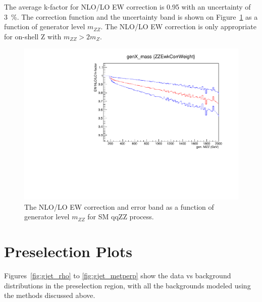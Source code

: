 \vspace{0.3cm}
The average k-factor for NLO/LO EW correction is 0.95 with an uncertainty of 3~\%. 
The correction function and the uncertainty band is shown on Figure~\ref{fig:qqzz_nlo_ew}
as a function of generator level $m_{ZZ}$. 
The NLO/LO EW correction is only appropriate for on-shell Z with $m_{ZZ}>2 m_{Z}$. 

\begin{figure}[htbp!]
\centering
  \includegraphics[width=0.48\linewidth]{figures/ewkfactor.pdf}
  \caption{The NLO/LO EW correction and error band as a function of generator level $m_{ZZ}$ for SM qqZZ process.}
  \label{fig:qqzz_nlo_ew}
\end{figure}

\clearpage
\section{Preselection Plots}
Figures~\ref{fig:gjet_rho} to \ref{fig:gjet_metperp} show the data vs background distributions in the preselection region, with all the backgrounds modeled using the methods discussed above. 


